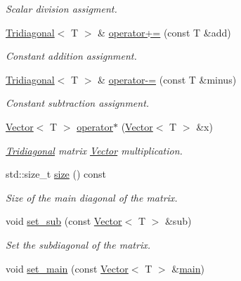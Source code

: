 \begin{DoxyCompactItemize}
\begin{DoxyCompactList}\small\item\em Scalar division assigment. \end{DoxyCompactList}\item 
\hyperlink{classLuna_1_1Tridiagonal}{Tridiagonal}$<$ T $>$ \& \hyperlink{classLuna_1_1Tridiagonal_aed6025d2b9420b4eb7488c2a644c1110}{operator+=} (const T \&add)
\begin{DoxyCompactList}\small\item\em Constant addition assignment. \end{DoxyCompactList}\item 
\hyperlink{classLuna_1_1Tridiagonal}{Tridiagonal}$<$ T $>$ \& \hyperlink{classLuna_1_1Tridiagonal_a77da1de7d41e6da4e7b99dc5e571a3a3}{operator-\/=} (const T \&minus)
\begin{DoxyCompactList}\small\item\em Constant subtraction assignment. \end{DoxyCompactList}\item 
\hyperlink{classLuna_1_1Vector}{Vector}$<$ T $>$ \hyperlink{classLuna_1_1Tridiagonal_a5262edb6caa8aac0186c480c3be2dcf2}{operator$\ast$} (\hyperlink{classLuna_1_1Vector}{Vector}$<$ T $>$ \&x)
\begin{DoxyCompactList}\small\item\em \hyperlink{classLuna_1_1Tridiagonal}{Tridiagonal} matrix \hyperlink{classLuna_1_1Vector}{Vector} multiplication. \end{DoxyCompactList}\item 
std\+::size\+\_\+t \hyperlink{classLuna_1_1Tridiagonal_ae8586e82968a8c28f7c50008e1f75411}{size} () const
\begin{DoxyCompactList}\small\item\em Size of the main diagonal of the matrix. \end{DoxyCompactList}\item 
void \hyperlink{classLuna_1_1Tridiagonal_a6d131d4c600e591c49e7825b52a1021c}{set\+\_\+sub} (const \hyperlink{classLuna_1_1Vector}{Vector}$<$ T $>$ \&sub)
\begin{DoxyCompactList}\small\item\em Set the subdiagonal of the matrix. \end{DoxyCompactList}\item 
void \hyperlink{classLuna_1_1Tridiagonal_a6594e3223659a5e9c7b911cda11ec5b3}{set\+\_\+main} (const \hyperlink{classLuna_1_1Vector}{Vector}$<$ T $>$ \&\hyperlink{Vector__algebra_8cpp_ae66f6b31b5ad750f1fe042a706a4e3d4}{main})

\end{DoxyCompactItemize}
